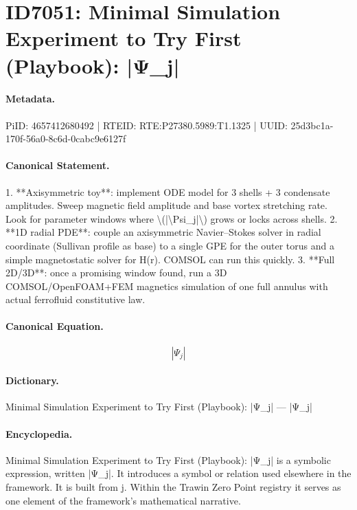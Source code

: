 \section*{ID7051: Minimal Simulation Experiment to Try First (Playbook): |Ψ\_j|}
\paragraph{Metadata.}
PiID: 4657412680492 | RTEID: RTE:P27380.5989:T1.1325 | UUID: 25d3bc1a-170f-56a0-8c6d-0cabc9e6127f

\paragraph{Canonical Statement.}
1. **Axisymmetric toy**: implement ODE model for 3 shells + 3 condensate amplitudes. Sweep magnetic field amplitude and base vortex stretching rate. Look for parameter windows where \textbackslash{}(|\textbackslash{}Psi\_j|\textbackslash{}) grows or locks across shells. 2. **1D radial PDE**: couple an axisymmetric Navier–Stokes solver in radial coordinate (Sullivan profile as base) to a single GPE for the outer torus and a simple magnetostatic solver for H(r). COMSOL can run this quickly. 3. **Full 2D/3D**: once a promising window found, run a 3D COMSOL/OpenFOAM+FEM magnetics simulation of one full annulus with actual ferrofluid constitutive law.

\paragraph{Canonical Equation.}
\[
|\Psi_j|
\]

\paragraph{Dictionary.}
Minimal Simulation Experiment to Try First (Playbook): |Ψ\_j| — |Ψ\_j|

\paragraph{Encyclopedia.}
Minimal Simulation Experiment to Try First (Playbook): |Ψ\_j| is a symbolic expression, written |Ψ\_j|. It introduces a symbol or relation used elsewhere in the framework. It is built from j. Within the Trawin Zero Point registry it serves as one element of the framework's mathematical narrative.

